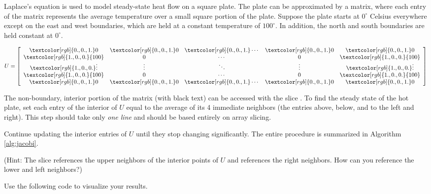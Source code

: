 \begin{problem}
Laplace's equation is used to model steady-state heat flow on a square plate.
The plate can be approximated by a matrix, where each entry of the matrix represents the average temperature over a small square portion of the plate.
Suppose the plate starts at $0^\circ$ Celsius everywhere except on the east and west boundaries, which are held at a constant temperature of $100^\circ$.
In addition, the north and south boundaries are held constant at $0^\circ$.

\[
U = \left[\begin{array}{ccccc}
\textcolor[rgb]{0.,0.,1.}0 & \textcolor[rgb]{0.,0.,1.}0 & \textcolor[rgb]{0.,0.,1.}\cdots & \textcolor[rgb]{0.,0.,1.}0 & \textcolor[rgb]{0.,0.,1.}0\\
\textcolor[rgb]{1.,0.,0.}{100} & 0 & \cdots & 0 & \textcolor[rgb]{1.,0.,0.}{100}\\
\textcolor[rgb]{1.,0.,0.}\vdots & \vdots & \ddots & \vdots & \textcolor[rgb]{1.,0.,0.}\vdots \\
\textcolor[rgb]{1.,0.,0.}{100} & 0 & \cdots & 0 & \textcolor[rgb]{1.,0.,0.}{100}\\
\textcolor[rgb]{0.,0.,1.}0 & \textcolor[rgb]{0.,0.,1.}0 & \textcolor[rgb]{0.,0.,1.}\cdots & \textcolor[rgb]{0.,0.,1.}0 & \textcolor[rgb]{0.,0.,1.}0\\

\end{array}\right]
\]

The non-boundary, interior portion of the matrix (with black text) can be accessed with the slice .
To find the steady state of the hot plate, set each entry of the interior of $U$ equal to the average of its 4 immediate neighbors (the entries above, below, and to the left and right).
This step should take only \emph{one line} and should be based entirely on array slicing.

Continue updating the interior entries of $U$ until they stop changing significantly.
The entire procedure is summarized in Algorithm \ref{alg:jacobi}.

(Hint: The slice  references the upper neighbors of the interior points of $U$ and  references the right neighbors. How can you reference the lower and left neighbors?)

Use the following code to visualize your results.



\end{problem}
